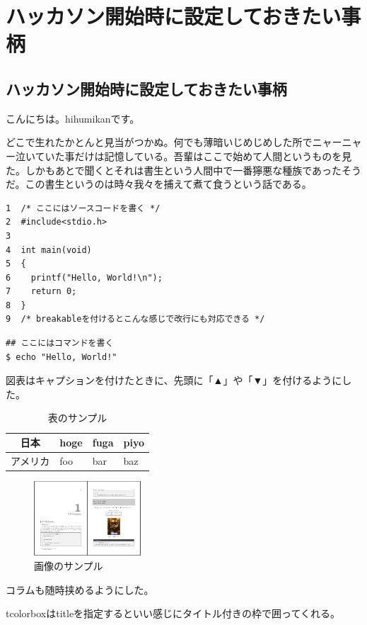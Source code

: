 \chapter{ハッカソン開始時に設定しておきたい事柄}
\section{ハッカソン開始時に設定しておきたい事柄}
こんにちは。hihumikanです。

どこで生れたかとんと見当がつかぬ。何でも薄暗いじめじめした所でニャーニャー泣いていた事だけは記憶している。吾輩はここで始めて人間というものを見た。しかもあとで聞くとそれは書生という人間中で一番獰悪な種族であったそうだ。この書生というのは時々我々を捕えて煮て食うという話である。

\begin{tcolorbox}[breakable]
\begin{verbatim}
1  /* ここにはソースコードを書く */
2  #include<stdio.h>
3
4  int main(void)
5  {
6    printf("Hello, World!\n");
7    return 0;
8  }
9  /* breakableを付けるとこんな感じで改行にも対応できる */
\end{verbatim}
\end{tcolorbox}

\begin{shaded}
\begin{verbatim}
## ここにはコマンドを書く
$ echo "Hello, World!"
\end{verbatim}
\end{shaded}

図表はキャプションを付けたときに、先頭に「▲」や「▼」を付けるようにした。

\begin{table}[H]
  \centering
  \caption{表のサンプル}
  \begin{tabular}{|c|l|l|l|} \hline
    日本 & hoge & fuga & piyo \\ \hline
    アメリカ & foo & bar & baz \\ \hline
  \end{tabular}
  \label{table-sample10302}
\end{table}

\begin{figure}[H]
  \centering
  \includegraphics[width=4cm]{./image/03-Tech/chap2/sample.png}
  \caption{画像のサンプル}
  \label{figure-sample10302}
\end{figure}

\begin{tcolorbox}[title=これはコラム]
  コラムも随時挟めるようにした。

  tcolorboxはtitleを指定するといい感じにタイトル付きの枠で囲ってくれる。
\end{tcolorbox}
